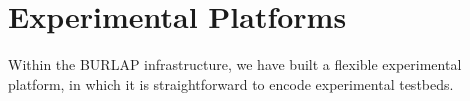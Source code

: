 
\section{Experimental Platforms}


Within the BURLAP infrastructure, we have built a flexible
experimental platform, in which it is straightforward to encode
experimental testbeds.  

